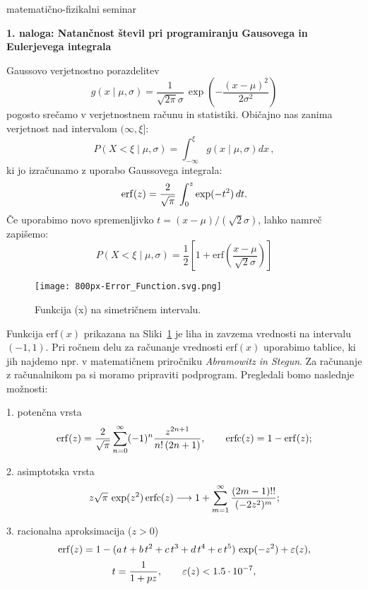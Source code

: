 \documentclass[12pt]{article}
\begin{document}
\thispagestyle{empty}


\setcounter{equation}{0}
\centerline{\sc matematično-fizikalni seminar~\thisyear}
\bigskip
\setcounter{equation}{0}
\centerline{\bf 1. naloga: Natančnost števil pri programiranju Gausovega in Eulerjevega integrala }
\bigskip
\bigskip

\noindent Gaussovo verjetnostno porazdelitev
\[
g(x \mid \mu, \sigma) = \frac{1}{\sqrt{2\pi} \sigma}\,
\exp \left(-\frac{(x-\mu)^2}{2\sigma^2}\right) \nonumber
\]
pogosto srečamo v verjetnostnem računu in statistiki. Običajno nas zanima verjetnost  nad intervalom $(\infty, \xi]$:
$$
P(X<\xi \mid \mu, \sigma ) = \int_{-\infty}^{\xi} g(x \mid \mu, \sigma) dx\,,
$$
ki jo izračunamo z uporabo Gaussovega integrala:
$$
{\rm erf}(z) = \frac{2}{\sqrt{\pi}} \,
\int_0^z {\exp}(-t^2)\,dt.
$$
Če uporabimo novo spremenljivko $t=(x-\mu)/(\sqrt{2}\sigma)$, lahko namreč zapišemo:
$$
P(X<\xi \mid \mu, \sigma )   = \frac{1}{2}\left[1+\mathrm{erf}\left(\frac{x-\mu}{\sqrt{2}\sigma}\right)\right]
$$

\begin{figure}[h]
\begin{center}
\texttt{[image: 800px-Error\_Function.svg.png]}
\end{center}
\caption{Funkcija (x) na simetričnem intervalu.\label{slika1}}
\end{figure}

Funkcija $\mathrm{erf}(x)$ prikazana na Sliki~\ref{slika1} je liha in zavzema vrednosti na intervalu $(-1,1)$. 
Pri ročnem delu za računanje vrednosti $\mathrm{erf}(x)$ uporabimo tablice, ki jih  najdemo npr. v matematičnem 
priročniku \textit{Abramowitz in Stegun}.  Za računanje z računalnikom pa si moramo pripraviti podprogram. 
Pregledali bomo naslednje možnosti:

\medskip

1. potenčna vrsta
\[
{\rm erf}(z) = {2\over\sqrt{\pi}} \sum_{n=0}^\infty
(-1)^n {z^{2n+1} \over{n!\, (2n+1)}}, \qquad
{\rm erfc}(z) = 1-{\rm erf}(z);
\]

2. asimptotska vrsta
\[
z \sqrt{\pi}\,\exp (z^2)\,{\rm erfc}(z)
\longrightarrow 1 + \sum_{m=1}^\infty {(2m-1)!!\over (-2z^2)^m};
\]

3. racionalna aproksimacija ($z>0$)
\[
{\rm erf}(z) = 1 - (a\,t+b\,t^2+c\,t^3+d\,t^4+e\,t^5)
\, \exp (-z^2)+\varepsilon (z),
\]
\[
t = {1\over 1+pz},\qquad \varepsilon (z) < 1.5 \cdot 10^{-7},
\]

\end{document}
